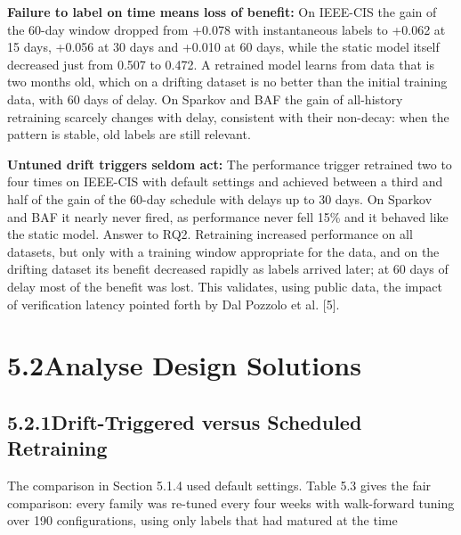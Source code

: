 \documentclass[11pt,letterpaper]{report}
\begin{document}
\textbf{Failure to label on time means loss of benefit:} On IEEE-CIS the gain of the 60-day window dropped from +0.078 with instantaneous labels to +0.062 at 15 days, +0.056 at 30 days and +0.010 at 60 days, while the static model itself decreased just from 0.507 to 0.472. A retrained model learns from data that is two months old, which on a drifting dataset is no better than the initial training data, with 60 days of delay. On Sparkov and BAF the gain of all-history retraining scarcely changes with delay, consistent with their non-decay: when the pattern is stable, old labels are still relevant.

\textbf{Untuned drift triggers seldom act:} The performance trigger retrained two to four times on IEEE-CIS with default settings and achieved between a third and half of the gain of the 60-day schedule with delays up to 30 days. On Sparkov and BAF it nearly never fired, as performance never fell 15\% and it behaved like the static model. Answer to RQ2. Retraining increased performance on all datasets, but only with a training window appropriate for the data, and on the drifting dataset its benefit decreased rapidly as labels arrived later; at 60 days of delay most of the benefit was lost. This validates, using public data, the impact of verification latency pointed forth by Dal Pozzolo et al. [5].

\section*{5.2\quad Analyse Design Solutions}

\subsection*{5.2.1\quad Drift-Triggered versus Scheduled Retraining}

The comparison in Section 5.1.4 used default settings. Table 5.3 gives the fair comparison: every family was re-tuned every four weeks with walk-forward tuning over 190 configurations, using only labels that had matured at the time
\end{document}
